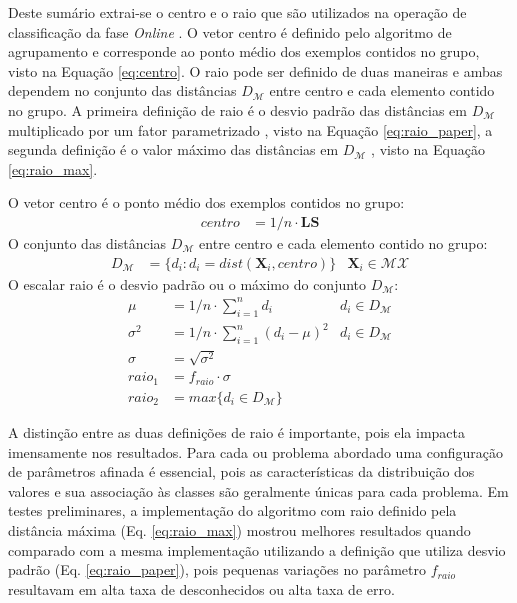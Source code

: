 
Deste sumário extrai-se o centro e o raio que são utilizados na operação de
classificação da fase \emph{Online} \cite{Faria2016minas}.
O vetor centro é definido pelo algoritmo de agrupamento e corresponde ao
ponto médio dos exemplos contidos no grupo, visto na Equação \ref{eq:centro}.
O raio pode ser definido de duas maneiras e ambas dependem no conjunto das
distâncias $D_\mathcal{M}$ entre centro e cada elemento contido no grupo.
A primeira definição de raio é o desvio padrão das distâncias em $D_\mathcal{M}$
multiplicado por um fator parametrizado \cite{Faria2016minas}, visto na Equação
\ref{eq:raio_paper}, a segunda definição é o valor máximo das distâncias em
$D_\mathcal{M}$ \cite{Faria2013source}, visto na Equação \ref{eq:raio_max}.

\begin{definition}
  O vetor centro é o ponto médio dos exemplos contidos no grupo:
  \begin{align}
    centro    &= 1/n \cdot \mathbf{LS} \label{eq:centro}
  \end{align}
  O conjunto das distâncias $D_\mathcal{M}$ entre centro e cada elemento contido no grupo:
  \begin{align}
    D_\mathcal{M}  &= \{ d_i : d_i = dist(\mathbf{X}_i, centro) \} & \mathbf{X}_i \in \mathcal{MX} \nonumber
  \end{align}
  O escalar raio é o desvio padrão ou o máximo do conjunto $D_\mathcal{M}$:
  \begin{align}
    \mu       &= 1/n \cdot \sum_{i=1}^{n} d_i             & d_i \in D_\mathcal{M} \nonumber \\
    \sigma^2  &= 1/n \cdot \sum_{i=1}^{n} (d_i - \mu) ^2  & d_i \in D_\mathcal{M} \nonumber \\
    \sigma    &= \sqrt{ \sigma^2 }                        & \nonumber \\
    raio_1    &= f_{raio} \cdot \sigma                    & \label{eq:raio_paper}\\
    raio_2    &= max\{ d_i \in D_\mathcal{M} \}           & \label{eq:raio_max}
  \end{align}
\end{definition}


A distinção entre as duas definições de raio é importante, pois ela impacta
imensamente nos resultados.
Para cada \dataset ou problema abordado uma configuração de parâmetros afinada
é essencial, pois as características da distribuição dos valores e sua associação
às classes são geralmente únicas para cada problema.
Em testes preliminares, a implementação do algoritmo \minas com raio definido
pela distância máxima (Eq. \ref{eq:raio_max}) mostrou melhores resultados quando
comparado com a mesma implementação utilizando a definição que utiliza desvio
padrão (Eq. \ref{eq:raio_paper}), pois pequenas variações no parâmetro $f_{raio}$
resultavam em alta taxa de desconhecidos ou alta taxa de erro.

